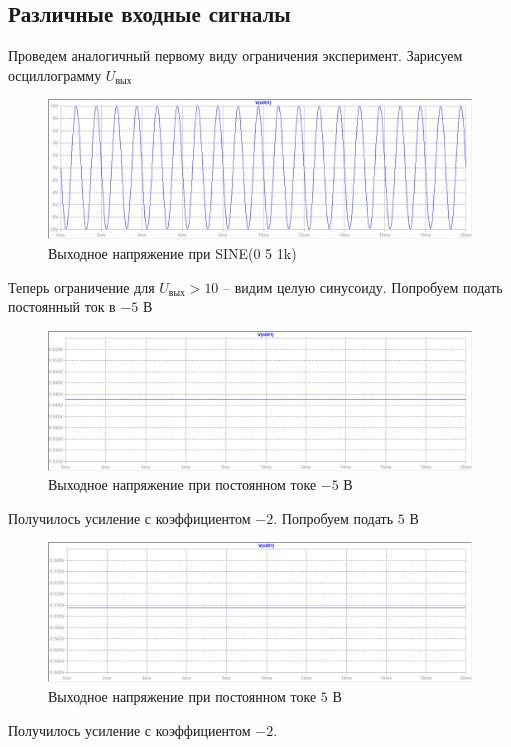 \documentclass[a4paper, 12pt]{article}
\begin{document}
    \subsection{Различные входные сигналы}
    Проведем аналогичный первому виду ограничения эксперимент.
    Зарисуем осциллограмму $U_\text{вых}$
    \begin{figure}[H]
        \centering
        \includegraphics[scale=0.46]{1task2_sine_a5_f1k.png}
        \captionsetup{skip=0pt}
        \caption{Выходное напряжение при SINE(0 5 1k)}
        \label{fig:1task2_sine_a5_f1k}
    \end{figure}
    \noindent Теперь ограничение для $U_\text{вых}>10$ -- видим целую синусоиду. Попробуем подать постоянный ток в $-5$ В
    \begin{figure}[H]
        \centering
        \includegraphics[scale=0.46]{1task2_const_m5.png}
        \captionsetup{skip=0pt}
        \caption{Выходное напряжение при постоянном токе $-5$ В}
        \label{fig:1task2_const_m5}
    \end{figure}
    \noindent Получилось усиление с коэффициентом $-2$. Попробуем подать $5$ В
    \begin{figure}[H]
        \centering
        \includegraphics[scale=0.46]{1task2_const_5.png}
        \captionsetup{skip=0pt}
        \caption{Выходное напряжение при постоянном токе $5$ В}
        \label{fig:1task2_const_5}
    \end{figure}
    \noindent Получилось усиление с коэффициентом $-2$.
\end{document}
